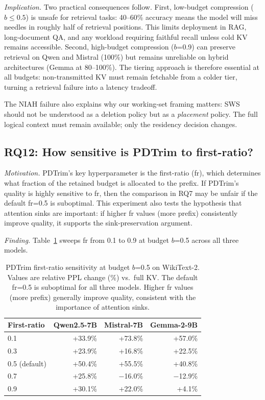\documentclass[11pt]{article}
\newcommand{\sws}{SWS}
\newcommand{\pct}{\%}
\theoremstyle{definition}
\theoremstyle{plain}
\begin{document}
\emph{Implication.}  Two practical consequences follow.  First, low-budget compression ($b \leq 0.5$) is unsafe for retrieval tasks: 40--60\pct{} accuracy means the model will miss needles in roughly half of retrieval positions.  This limits deployment in RAG, long-document QA, and any workload requiring faithful recall unless cold KV remains accessible.  Second, high-budget compression ($b$=0.9) can preserve retrieval on Qwen and Mistral (100\pct{}) but remains unreliable on hybrid architectures (Gemma at 80--100\pct{}).  The tiering approach is therefore essential at all budgets: non-transmitted KV must remain fetchable from a colder tier, turning a retrieval failure into a latency tradeoff.

The NIAH failure also explains why our working-set framing matters: \sws{} should not be understood as a deletion policy but as a \emph{placement} policy.  The full logical context must remain available; only the residency decision changes.

\subsection{RQ12: How sensitive is PDTrim to first-ratio?}
\label{sec:rq12}

\emph{Motivation.}  PDTrim's key hyperparameter is the first-ratio (fr), which determines what fraction of the retained budget is allocated to the prefix.  If PDTrim's quality is highly sensitive to fr, then the comparison in RQ7 may be unfair if the default fr=0.5 is suboptimal.  This experiment also tests the hypothesis that attention sinks are important: if higher fr values (more prefix) consistently improve quality, it supports the sink-preservation argument.

\emph{Finding.}  Table~\ref{tab:fr-scan} sweeps fr from 0.1 to 0.9 at budget $b$=0.5 across all three models.

\begin{table}[t]
\centering
\caption{PDTrim first-ratio sensitivity at budget $b$=0.5 on WikiText-2.  Values are relative PPL change (\%) vs.\ full KV.  The default fr=0.5 is suboptimal for all three models.  Higher fr values (more prefix) generally improve quality, consistent with the importance of attention sinks.}
\label{tab:fr-scan}
\small
\begin{tabular}{lrrr}
\toprule
First-ratio & Qwen2.5-7B & Mistral-7B & Gemma-2-9B \\
\midrule
0.1 & +33.9\pct{} & +73.8\pct{} & +57.0\pct{} \\
0.3 & +23.9\pct{} & +16.8\pct{} & +22.5\pct{} \\
0.5 (default) & +50.4\pct{} & +55.5\pct{} & +40.8\pct{} \\
0.7 & +25.8\pct{} & $-$16.0\pct{} & $-$12.9\pct{} \\
0.9 & +30.1\pct{} & +22.0\pct{} & +4.1\pct{} \\
\bottomrule
\end{tabular}
\end{table}
\end{document}
